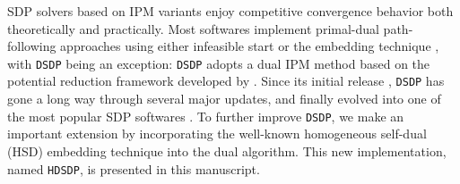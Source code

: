 SDP solvers based on IPM variants enjoy competitive convergence behavior both theoretically and practically. Most softwares implement primal-dual path-following approaches using either infeasible start
{\cite{potra1998superlinearly}} or the embedding technique
{\cite{potra1998homogeneous}}, with {{\texttt{DSDP}}} being an exception:
{{\texttt{DSDP}}} adopts a dual IPM method based on the potential reduction framework developed by {\citet{benson1999mixed}}.
Since its initial release {\cite{benson2000solving}}, {{\texttt{DSDP}}} has gone a long way through several major updates, and finally evolved into one of the most popular SDP softwares {\cite{benson2008algorithm}}.
To further improve {{\texttt{DSDP}}}, we make an important extension by incorporating the well-known homogeneous self-dual (HSD)
embedding technique into the dual algorithm. This new implementation, named {{\texttt{HDSDP}}}, is presented in this manuscript.\\

